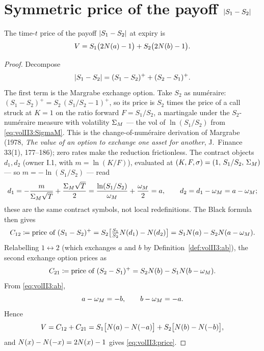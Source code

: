 \section{Symmetric price of the payoff \(\lvert S_1 - S_2\rvert\)}
\label{sec:volII3:price}

\begin{proposition}\label{prop:volII3:price}
The time-$t$ price of the payoff $\lvert S_1 - S_2\rvert$ at expiry is
\begin{equation}\label{eq:volII3:price}
V = S_1 \bigl(2N(a) - 1\bigr) + S_2 \bigl(2N(b) - 1\bigr).
\end{equation}
\end{proposition}

\begin{proof}
Decompose
\begin{equation}\label{eq:volII3:decomp}
\lvert S_1 - S_2\rvert = (S_1 - S_2)^+ + (S_2 - S_1)^+ .
\end{equation}
The first term is the Margrabe exchange option. Take $S_2$ as num\'eraire:
$(S_1 - S_2)^+ = S_2\,(S_1/S_2 - 1)^+$, so its price is $S_2$ times the price
of a call struck at $K = 1$ on the ratio forward $F = S_1/S_2$, a martingale
under the $S_2$-num\'eraire measure with volatility $\Sigma_M$ --- the vol of
$\ln(S_1/S_2)$ from \eqref{eq:volII3:SigmaM}. This is the change-of-num\'eraire
derivation of Margrabe (1978, \emph{The value of an option to exchange one
asset for another}, J.~Finance 33(1), 177--186); zero rates make the reduction
frictionless. The contract objects $d_1, d_2$ (owner I.1, with
$m = \ln(K/F)$), evaluated at $(K, F, \sigma) = (1,\, S_1/S_2,\, \Sigma_M)$ ---
so $m = -\ln(S_1/S_2)$ --- read
\begin{equation}\label{eq:volII3:d1d2}
d_1 = -\frac{m}{\Sigma_M\sqrt{T}} + \frac{\Sigma_M\sqrt{T}}{2}
    = \frac{\ln(S_1/S_2)}{\omega_M} + \frac{\omega_M}{2} = a,
\qquad
d_2 = d_1 - \omega_M = a - \omega_M ;
\end{equation}
these are the same contract symbols, not local redefinitions. The Black
formula then gives
\begin{equation}\label{eq:volII3:C12}
C_{12} \coloneqq \text{price of } (S_1 - S_2)^+
= S_2\bigl[\tfrac{S_1}{S_2}N(d_1) - N(d_2)\bigr]
= S_1N(a) - S_2N(a - \omega_M).
\end{equation}
Relabelling $1 \leftrightarrow 2$ (which exchanges $a$ and $b$ by
Definition~\ref{def:volII3:ab}), the second exchange option prices as
\begin{equation}\label{eq:volII3:C21}
C_{21} \coloneqq \text{price of } (S_2 - S_1)^+
= S_2N(b) - S_1N(b - \omega_M) .
\end{equation}
From \eqref{eq:volII3:ab},
\begin{equation}\label{eq:volII3:abrel}
a - \omega_M = -b, \qquad b - \omega_M = -a .
\end{equation}
Hence
\begin{equation}\label{eq:volII3:Vsym}
V = C_{12} + C_{21}
  = S_1\bigl[N(a) - N(-a)\bigr] + S_2\bigl[N(b) - N(-b)\bigr],
\end{equation}
and $N(x) - N(-x) = 2N(x) - 1$ gives \eqref{eq:volII3:price}.
\end{proof}

